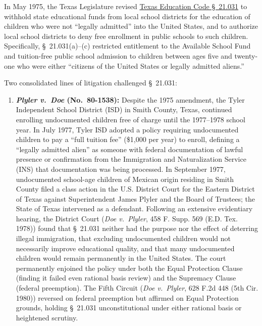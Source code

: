 \documentclass[12pt]{article}
\begin{document}
In May 1975, the Texas Legislature revised \href{https://www.law.cornell.edu/supremecourt/text/457/202}{Texas Education Code \S~21.031} to withhold state educational funds from local school districts for the education of children who were not ``legally admitted'' into the United States, and to authorize local school districts to deny free enrollment in public schools to such children. Specifically, \S~21.031(a)--(c) restricted entitlement to the Available School Fund and tuition-free public school admission to children between ages five and twenty-one who were either ``citizens of the United States or legally admitted aliens.''

Two consolidated lines of litigation challenged \S~21.031:

\begin{enumerate}
    \item \textbf{\textit{Plyler v.\ Doe} (No.\ 80-1538):} Despite the 1975 amendment, the Tyler Independent School District (ISD) in Smith County, Texas, continued enrolling undocumented children free of charge until the 1977--1978 school year. In July 1977, Tyler ISD adopted a policy requiring undocumented children to pay a ``full tuition fee'' (\$1,000 per year) to enroll, defining a ``legally admitted alien'' as someone with federal documentation of lawful presence or confirmation from the Immigration and Naturalization Service (INS) that documentation was being processed. In September 1977, undocumented school-age children of Mexican origin residing in Smith County filed a class action in the U.S. District Court for the Eastern District of Texas against Superintendent James Plyler and the Board of Trustees; the State of Texas intervened as a defendant. Following an extensive evidentiary hearing, the District Court (\textit{Doe v.\ Plyler}, 458 F. Supp. 569 (E.D. Tex. 1978)) found that \S~21.031 neither had the purpose nor the effect of deterring illegal immigration, that excluding undocumented children would not necessarily improve educational quality, and that many undocumented children would remain permanently in the United States. The court permanently enjoined the policy under both the Equal Protection Clause (finding it failed even rational basis review) and the Supremacy Clause (federal preemption). The Fifth Circuit (\textit{Doe v.\ Plyler}, 628 F.2d 448 (5th Cir. 1980)) reversed on federal preemption but affirmed on Equal Protection grounds, holding \S~21.031 unconstitutional under either rational basis or heightened scrutiny.

\end{enumerate}
\end{document}
